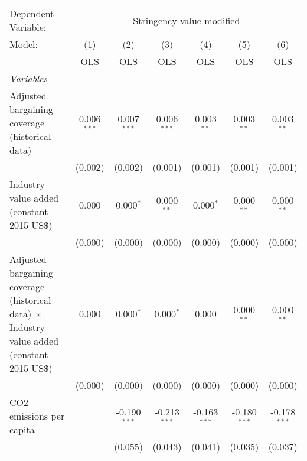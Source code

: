 
\begingroup
\centering
\begin{tabular}{lcccccc}
   \toprule
   Dependent Variable: & \multicolumn{6}{c}{Stringency value modified}\\
   Model:                                                                                              & (1)           & (2)            & (3)            & (4)            & (5)            & (6)\\  
                                                                                                       &  OLS          & OLS            & OLS            & OLS            & OLS            & OLS\\  
   \midrule
   \emph{Variables}\\
   Adjusted bargaining coverage (historical data)                                                      & 0.006$^{***}$ & 0.007$^{***}$  & 0.006$^{***}$  & 0.003$^{**}$   & 0.003$^{**}$   & 0.003$^{**}$\\   
                                                                                                       & (0.002)       & (0.002)        & (0.001)        & (0.001)        & (0.001)        & (0.001)\\   
   Industry value added (constant 2015 US\$)                                                           & 0.000         & 0.000$^{*}$    & 0.000$^{**}$   & 0.000$^{*}$    & 0.000$^{**}$   & 0.000$^{**}$\\   
                                                                                                       & (0.000)       & (0.000)        & (0.000)        & (0.000)        & (0.000)        & (0.000)\\   
   Adjusted bargaining coverage (historical data) $\times$ Industry value added (constant 2015 US\$)   & 0.000         & 0.000$^{*}$    & 0.000$^{*}$    & 0.000          & 0.000$^{**}$   & 0.000$^{**}$\\   
                                                                                                       & (0.000)       & (0.000)        & (0.000)        & (0.000)        & (0.000)        & (0.000)\\   
   CO2 emissions per capita                                                                            &               & -0.190$^{***}$ & -0.213$^{***}$ & -0.163$^{***}$ & -0.180$^{***}$ & -0.178$^{***}$\\   
                                                                                                       &               & (0.055)        & (0.043)        & (0.041)        & (0.035)        & (0.037)\\   

\end{tabular}
